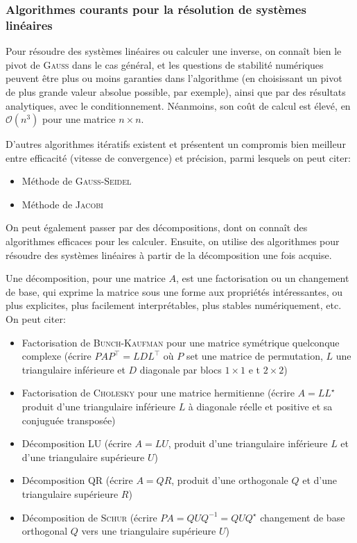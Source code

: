 \documentclass[svgnames,dvipsnames,a4paper,10pt,french]{report}
\begin{document}
\subsubsection{Algorithmes courants pour la résolution de systèmes linéaires}

Pour résoudre des systèmes linéaires ou calculer une inverse, on connaît bien le pivot de \textsc{Gauss} dans le cas général, et les questions de stabilité numériques peuvent être plus ou moins garanties dans l'algorithme (en choisissant un pivot de plus grande valeur absolue possible, par exemple), ainsi que par des résultats analytiques, avec le conditionnement. Néanmoins, son coût de calcul est élevé, en $\mathcal{O}(n^3)$ pour une matrice $n\times n$.

D'autres algorithmes itératifs existent et présentent un compromis bien meilleur entre efficacité (vitesse de convergence) et précision, parmi lesquels on peut citer:
\begin{itemize}
    \item Méthode de \textsc{Gauss-Seidel}
    \item Méthode de \textsc{Jacobi} %
\end{itemize}

On peut également passer par des décompositions, dont on connaît des algorithmes efficaces pour les calculer. Ensuite, on utilise des algorithmes  pour résoudre des systèmes linéaires à partir de la décomposition une fois acquise.

Une décomposition, pour une matrice $A$, est une factorisation ou un changement de base, qui exprime la matrice sous une forme aux propriétés intéressantes, ou plus explicites, plus facilement interprétables, plus stables numériquement, etc. On peut citer:
\begin{itemize}
    \item Factorisation de \textsc{Bunch-Kaufman} pour une matrice symétrique quelconque complexe (écrire $PAP^\intercal=LDL^\intercal$ où $P$ set une matrice de permutation, $L$ une triangulaire inférieure et  $D$ diagonale par blocs $1\times 1$ e t $2\times 2$)
    \item Factorisation de \textsc{Cholesky} pour une matrice hermitienne (écrire $A=LL^\star$ produit d'une triangulaire inférieure $L$ à diagonale réelle et positive  et sa conjuguée transposée)
    \item Décomposition LU (écrire $A=LU$, produit d'une triangulaire inférieure $L$ et d'une triangulaire supérieure $U$)
    \item Décomposition QR (écrire $A=QR$, produit d'une orthogonale $Q$ et d'une triangulaire supérieure $R$)
    \item Décomposition de \textsc{Schur} (écrire $PA=QUQ^{-1}=QUQ^\star$ changement de base orthogonal $Q$ vers une triangulaire supérieure $U$)
\end{itemize}
\end{document}
